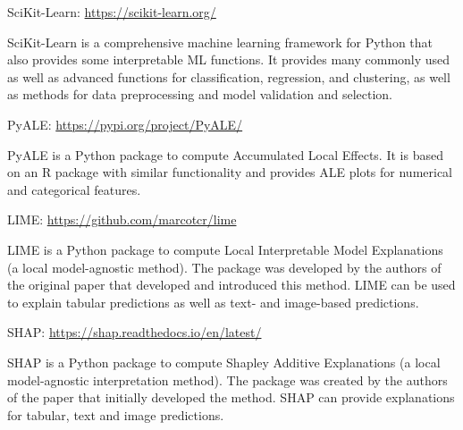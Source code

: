 \begin{withcode}
\begin{resourcebox}
\vspace{\baselineskip}

SciKit-Learn: \small\url{https://scikit-learn.org/}\normalsize

\vspace{\baselineskip}
\end{resourcebox}

SciKit-Learn is a comprehensive machine learning framework for Python that also provides some interpretable ML functions. It provides many commonly used as well as advanced functions for classification, regression, and clustering, as well as methods for data preprocessing and model validation and selection.

\begin{resourcebox}
\vspace{\baselineskip}

PyALE: \small\url{https://pypi.org/project/PyALE/}\normalsize

\vspace{\baselineskip}
\end{resourcebox}

PyALE is a Python package to compute Accumulated Local Effects. It is based on an R package with similar functionality and provides ALE plots for numerical and categorical features.

\begin{resourcebox}
\vspace{\baselineskip}

LIME: \small\url{https://github.com/marcotcr/lime}\normalsize

\vspace{\baselineskip}
\end{resourcebox}

LIME is a Python package to compute Local Interpretable Model Explanations (a local model-agnostic method). The package was developed by the authors of the original paper that developed and introduced this method. LIME can be used to explain tabular predictions as well as text- and image-based predictions.

\begin{resourcebox}
\vspace{\baselineskip}

SHAP: \small\url{https://shap.readthedocs.io/en/latest/}\normalsize

\vspace{\baselineskip}
\end{resourcebox}

SHAP is a Python package to compute Shapley Additive Explanations (a local model-agnostic interpretation method). The package was created by the authors of the paper that initially developed the method. SHAP can provide explanations for tabular, text and image predictions. 
\end{withcode}

